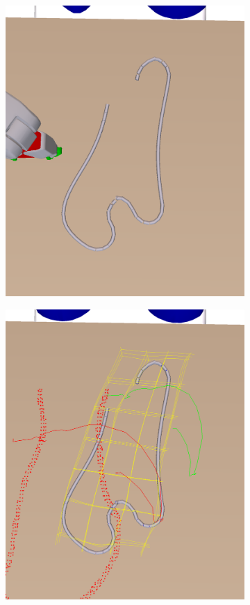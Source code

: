 \documentclass{article}
\begin{document}
\begin{figure}
\centering
\begin{subfigure}[b]{.24\textwidth}
\includegraphics[width=\textwidth]{no_lookahead_fail_start.png}
\caption{}
\end{subfigure}
\begin{subfigure}[b]{.24\textwidth}
\includegraphics[width=\textwidth]{sim_res1.png}

\end{subfigure}
\end{figure}
\end{document}
